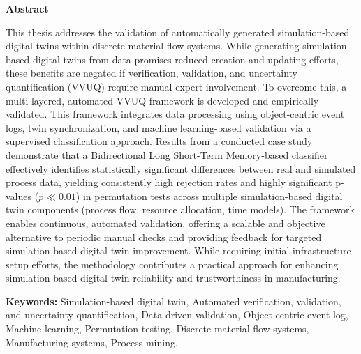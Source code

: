 \thispagestyle{plain}

\vspace*{1.5in}

\begin{center}
  {\Large \textbf{Abstract}}
\end{center}

This thesis addresses the validation of automatically generated simulation-based digital twins within discrete material flow systems. While generating simulation-based digital twins from data promises reduced creation and updating efforts, these benefits are negated if verification, validation, and uncertainty quantification (VVUQ) require manual expert involvement. To overcome this, a multi-layered, automated VVUQ framework is developed and empirically validated. This framework integrates data processing using object-centric event logs, twin synchronization, and machine learning-based validation via a supervised classification approach. Results from a conducted case study demonstrate that a Bidirectional Long Short-Term Memory-based classifier effectively identifies statistically significant differences between real and simulated process data, yielding consistently high rejection rates and highly significant p-values ($p \ll 0.01$) in permutation tests across multiple simulation-based digital twin components (process flow, resource allocation, time models). The framework enables continuous, automated validation, offering a scalable and objective alternative to periodic manual checks and providing feedback for targeted simulation-based digital twin improvement. While requiring initial infrastructure setup efforts, the methodology contributes a practical approach for enhancing simulation-based digital twin reliability and trustworthiness in manufacturing.

\vspace{0.3in}

\textbf{Keywords:} Simulation-based digital twin, Automated verification, validation, and uncertainty quantification, Data-driven validation, Object-centric event log, Machine learning, Permutation testing, Discrete material flow systems, Manufacturing systems, Process mining.

\clearpage